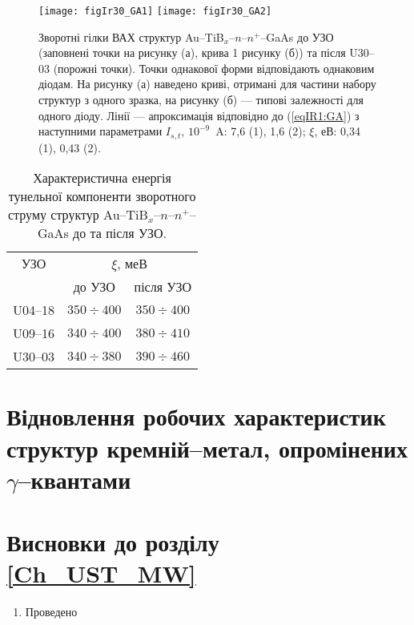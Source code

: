 \documentclass[a4paper,14pt,oneside,openany]{memoir}
\begin{document}

\begin{figure}
\center
\texttt{[image: figIr30\_GA1]} \hfill
\texttt{[image: figIr30\_GA2]}
\caption{\label{figIr30_GA}
Зворотні гілки ВАХ структур Au--TiB$_x$--$n$--$n^+$--GaAs
до УЗО (заповнені точки на рисунку (а), крива 1 рисунку (б))
та після U30--03 (порожні точки).
Точки однакової форми відповідають однаковим діодам.
На рисунку (а) наведено криві, отримані для частини набору структур з одного зразка,
на рисунку (б) --- типові залежності для одного діоду.
Лінії --- апроксимація відповідно до (\ref{eqIR1:GA}) з наступними параметрами
$I_{s,t}$, $10^{-9}$~A: 7,6 (1), 1,6 (2);
$\xi$, еВ: 0,34 (1), 0,43 (2).
}%
\end{figure}

\begin{table}
\caption{\label{tabUS_GaAs}Характеристична енергія тунельної компоненти
зворотного струму структур Au--TiB$_x$--$n$--$n^+$--GaAs до та після УЗО.
}
\center
\begin{tabular}{|c|c|c|}
\hline
УЗО&\multicolumn{2}{c|}{$\xi$, меВ}\\ \cline{2-3}
& до УЗО & після УЗО \\
\hline
U04--18&$350\div400$&$350\div400$\\ \hline
U09--16&$340\div400$&$380\div410$\\ \hline
U30--03&$340\div380$&$390\div460$\\ \hline
\end{tabular}
\end{table}


\section{Відновлення робочих характеристик структур кремній--метал, опромінених $\gamma$--квантами}



\section*{Висновки до розділу \ref{Ch_UST_MW}}
  \begin{enumerate}
     \item Проведено
  \end{enumerate}	
\end{document}
